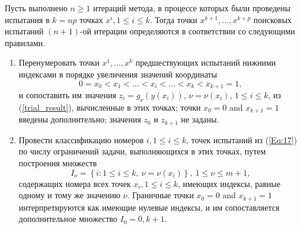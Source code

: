 \documentclass[
11pt,%
tightenlines,%
twoside,%
onecolumn,%
nofloats,%
nobibnotes,%
nofootinbib,%
superscriptaddress,%
noshowpacs,%
centertags]%
{revtex4}
\begin{document}
Пусть выполнено $n\geq 1$  итераций метода, в процессе которых были проведены испытания в $k=np$ точках $x^i, 1\leq i \leq k$. Тогда точки $x^{k+1},...,x^{k+p}$  поисковых испытаний $(n+1)$-ой итерации определяются в соответствии со следующими правилами.

\begin{enumerate}
\item 
Перенумеровать точки $x^1,...,x^k$ предшествующих испытаний нижними индексами в порядке увеличения значений координаты
\begin{equation}\label{Eq:17}
0=x_0<x_1<...<x_i<...<x_k<x_{k+1}=1,
\end{equation}
и сопоставить им значения $z_i=g_\nu(y(x_i))$, $\nu=\nu(x_i)$, $1 \leq i \leq k$, из (\ref{trial_result}), вычисленные в этих точках; точки $x_0=0$ and $x_{k+1}=1$ введены дополнительно; значения $z_0$ и $z_{k+1}$ не заданы.
\item
Провести классификацию номеров  $i,1\leq i \leq k$, точек испытаний из  (\ref{Eq:17}) по числу ограничений задачи, выполняющихся в этих точках, путем построения множеств
\begin{equation}\label{Eq:18}
I_\nu = \left\{i: 1 \leq i \leq k,\ \nu = \nu(x_i)\right\},\ 1 \leq \nu \leq m+1,
\end{equation}
содержащих номера всех точек  $x_i,1\leq i \leq k$, имеющих индексы, равные одному и тому же значению $\nu$. Граничные точки $x_0=0$ and $x_{k+1}=1$ интерпретируются как имеющие нулевые индексы, и им сопоставляется дополнительное множество $I_0={0,k+1}$. 


\end{enumerate}
\end{document}
